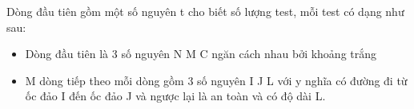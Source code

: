 Dòng đầu tiên gồm một số nguyên t cho biết số lượng test, mỗi test có dạng như sau:
\begin{itemize}
	\item Dòng đầu tiên là 3 số nguyên N M C ngăn cách nhau bởi khoảng trắng
	\item M dòng tiếp theo mỗi dòng gồm 3 số nguyên I J L với y nghĩa có đường đi từ ốc đảo I đến ốc đảo J và ngược lại là an toàn và có độ dài L.
\end{itemize}